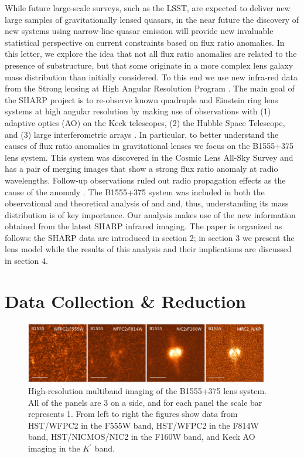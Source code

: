 \documentclass[useAMS,usenatbib]{mn2e}
\begin{document}
While future large-scale surveys, such as the LSST, are expected to
deliver new large samples of gravitationally lensed quasars, in the
near future the discovery of new systems using narrow-line quasar
emission \citep{N14} will provide new invaluable statistical
perspective on current constraints based on flux ratio anomalies.  In
this letter, we explore the idea that not all flux ratio anomalies are
related to the presence of substructure, but that some originate in a
more complex lens galaxy mass distribution than initially
considered. To this end we use new infra-red data from the Strong
lensing at High Angular Resolution Program 
\citep[SHARP;][Fassnacht et al., in prep]{SHARP12}.
The main goal of the SHARP project is to re-observe known
quadruple and Einstein ring lens systems at high angular
resolution by making use of observations with (1) adaptive optics (AO)
on the Keck telescopes, (2) the Hubble Space Telescope, and (3) large
interferometric arrays \citep{SHARP12,V12}. In particular, to better
understand the causes of flux ratio anomalies in gravitational lenses
we focus on the B1555+375 lens system\citep{Marlow99}.  This system was
discovered in the Cosmic Lens All-Sky Survey \citep{CLASS1,CLASS2} and
has a pair of merging images that show a strong flux ratio anomaly at
radio wavelengths.  Follow-up observations ruled out radio propagation
effects as the cause of the anomaly \citep{K03,KD04}.  The B1555+375
system was included in both the observational and theoretical analysis
of \citet{Dalal2002} and \citet{Xu14} and, thus, understanding its
mass distribution is of key importance.  Our analysis makes use of
the new information obtained from the latest SHARP infrared imaging.
The paper is organized as follows: the  SHARP data are
introduced in section 2; in section 3 we present the lens model while
the results of this analysis and their implications are discussed in
section 4.

\section{Data Collection \& Reduction}

\begin{figure}
\includegraphics[width=0.95\textwidth]{B1555_gallery.eps}
\caption{High-resolution multiband imaging of the B1555+375 lens system.
All of the panels are 3 on a side, and for each panel the scale bar 
represents 1\arcsec.  From left to right the figures show data from
HST/WFPC2 in the F555W band, HST/WFPC2 in the F814W band, HST/NICMOS/NIC2
in the F160W band, and Keck AO imaging in the $K^\prime$ band.
\label{fig:multiband}}
%

\end{figure}
\end{document}
